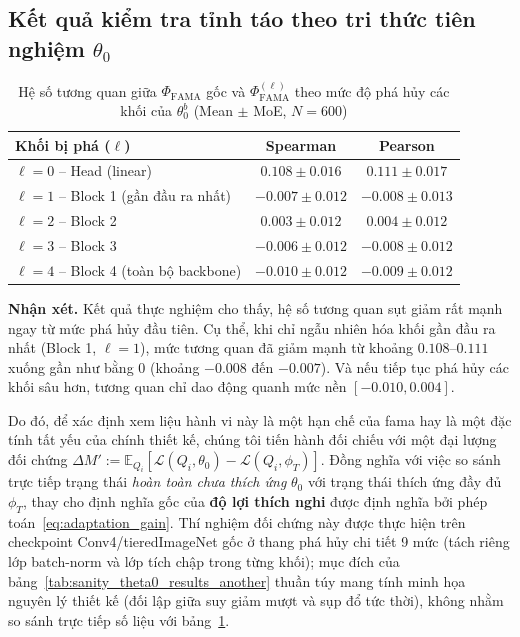 \subsection{Kết quả kiểm tra tỉnh táo theo tri thức tiên nghiệm $\theta_0$}
\label{subsec:sanity_theta0_results}

\begin{table}[H]
\centering
\caption{Hệ số tương quan giữa $\Phi_{\text{FAMA}}$ gốc và $\Phi_{\text{FAMA}}^{(\ell)}$ theo mức độ phá hủy các khối của $\theta_0^b$ (Mean $\pm$ MoE, $N=600$)}
\label{tab:sanity_theta0_results}
\begin{tabular}{|l|c|c|}
\hline
\textbf{Khối bị phá ($\ell$)} & \textbf{Spearman} & \textbf{Pearson} \\ \hline
$\ell=0$ -- Head (linear) & $0.108 \pm 0.016$ & $0.111 \pm 0.017$ \\ \hline
$\ell=1$ -- Block 1 (gần đầu ra nhất) & $-0.007 \pm 0.012$ & $-0.008 \pm 0.013$ \\ \hline
$\ell=2$ -- Block 2 & $0.003 \pm 0.012$ & $0.004 \pm 0.012$ \\ \hline
$\ell=3$ -- Block 3 & $-0.006 \pm 0.012$ & $-0.008 \pm 0.012$ \\ \hline
$\ell=4$ -- Block 4 (toàn bộ backbone) & $-0.010 \pm 0.012$ & $-0.009 \pm 0.012$ \\ \hline
\end{tabular}
\end{table}

\textbf{Nhận xét.} Kết quả thực nghiệm cho thấy, hệ số tương quan sụt giảm rất mạnh ngay từ mức phá hủy đầu tiên. Cụ thể, khi chỉ ngẫu nhiên hóa khối gần đầu ra nhất (Block 1, $\ell=1$), mức tương quan đã giảm mạnh từ khoảng $0.108$--$0.111$ xuống gần như bằng 0 (khoảng $-0.008$ đến $-0.007$). Và nếu tiếp tục phá hủy các khối sâu hơn, tương quan chỉ dao động quanh mức nền $[-0.010, 0.004]$.

Do đó, để xác định xem liệu hành vi này là một hạn chế của \acrshort{fama} hay là một đặc tính tất yếu của chính thiết kế, chúng tôi tiến hành đối chiếu với một đại lượng đối chứng $\Delta M' := \mathbb{E}_{Q_i}[\mathcal{L}(Q_i,\theta_0) - \mathcal{L}(Q_i,\phi_T)]$. Đồng nghĩa với việc so sánh trực tiếp trạng thái \emph{hoàn toàn chưa thích ứng} $\theta_0$ với trạng thái thích ứng đầy đủ $\phi_T$, thay cho định nghĩa gốc của \textbf{độ lợi thích nghi} được định nghĩa bởi phép toán~\eqref{eq:adaptation_gain}. Thí nghiệm đối chứng này được thực hiện trên checkpoint Conv4/tieredImageNet gốc ở thang phá hủy chi tiết 9 mức (tách riêng lớp batch-norm và lớp tích chập trong từng khối); mục đích của bảng~\ref{tab:sanity_theta0_results_another} thuần túy mang tính minh họa nguyên lý thiết kế (đối lập giữa suy giảm mượt và sụp đổ tức thời), không nhằm so sánh trực tiếp số liệu với bảng~\ref{tab:sanity_theta0_results}.

